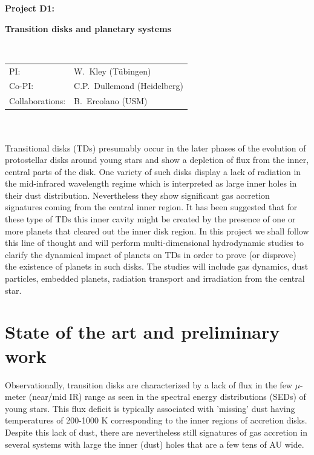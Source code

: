 \documentclass[10pt,fleqn,twoside]{article}
\begin{document}
\newpage


\setcounter{page}{1}

\centerline{\huge\bf\Tcol
%
%
%
%
%
 Project D1:}
\vspace{1em}

\centerline{\LARGE\bf\Tcol Transition disks and planetary systems}

%
%
%
%
%
\vskip1.0cm


\\
\begin{tabular}{ll}
{\textsf{PI:}}               & W.~Kley (T\"ubingen)\\
{\textsf{Co-PI:}}             & C.P.~Dullemond (Heidelberg)\\
{\textsf{Collaborations:}}     & B.~Ercolano (USM) \\
\end{tabular}


\vspace{1em}
 \\

\vspace{1em}
\\
Transitional disks (TDs) presumably occur in the later phases of the evolution of
protostellar disks around young stars and show a depletion of flux from the inner, central parts of the disk.
One variety of such disks display a lack of radiation in the mid-infrared wavelength regime which is interpreted
as large inner holes in their dust distribution.
Nevertheless they show significant gas accretion signatures coming from the central inner region. 
It has been suggested that for these type of TDs this inner cavity might be
created by the presence of one or more planets that cleared out the inner disk region.
In this project we shall follow this line of thought and will perform multi-dimensional hydrodynamic studies
to clarify the dynamical impact of planets on TDs in order to prove (or disprove) the existence of planets in such disks.
The studies will include gas dynamics, dust particles, embedded planets, radiation transport
and irradiation from the central star.

\section{State of the art and preliminary work}
\renewcommand{\leftmark}{\sc State of the Art and preliminary work}
Observationally, transition disks are characterized by a lack of
flux in the few $\mu$-meter (near/mid IR) range as seen in the spectral energy distributions
(SEDs) of young stars. This flux deficit is typically associated with
'missing' dust having temperatures of 200-1000 K 
\citep{2002ApJ...568.1008C,2005ApJ...621..461D}
corresponding to the inner regions of accretion disks. Despite this lack of dust,
there are nevertheless still signatures of gas accretion in several systems with large the inner (dust) holes
that are a few tens of AU wide. 
\end{document}
